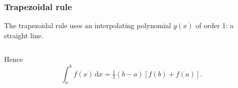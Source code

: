 \documentclass{beamer}
\begin{document}
\begin{frame}
  \frametitle{Trapezoidal rule}

  The trapezoidal rule uses an interpolating polynomial $g(x)$ of
  order 1: a straight line.
  \begin{columns}
    \begin{column}{0.5\textwidth}
      \begin{overlayarea}{\textwidth}{0.7\textheight}
        {
          \vspace{1ex}
          Hence
          \begin{equation*}
            \int_a^b f(x) \, \text{d}x = \tfrac{1}{2} (b - a) \left[ f(b) +
              f(a) \right].
          \end{equation*}
        }
        {

}
\end{overlayarea}
\end{column}
\end{columns}
\end{frame}
\end{document}
